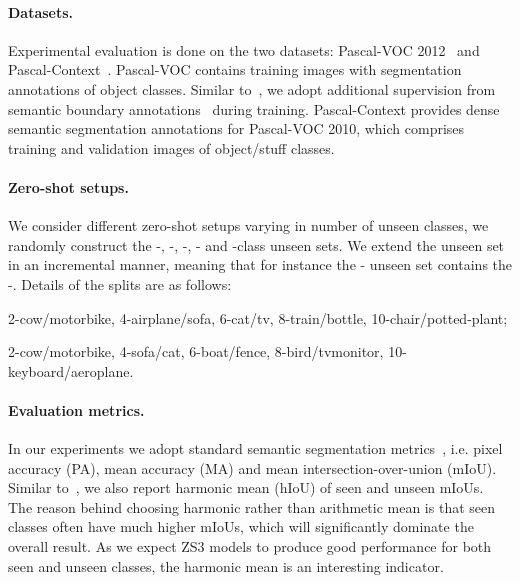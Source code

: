 \documentclass{article}
\begin{document}
\paragraph{Datasets.} Experimental evaluation is done on the two datasets: Pascal-VOC 2012~\cite{everingham2015pascal} and Pascal-Context~\cite{mottaghi2014role}.
Pascal-VOC contains  training images with segmentation annotations of  object classes.
Similar to~\cite{chen2018encoder}, we adopt additional supervision from semantic boundary annotations~\cite{hariharan2011semantic} during training.
Pascal-Context provides dense semantic segmentation annotations for Pascal-VOC 2010, which comprises  training and  validation images of  object/stuff classes.


\vspace{-0.3cm}
\paragraph{Zero-shot setups.}
We consider different zero-shot setups varying in number of unseen classes, we randomly construct the -, -, -, - and -class unseen sets.
We extend the unseen set in an incremental manner, meaning that for instance the - unseen set contains the -. Details of the splits are as follows:

\begin{description}[noitemsep,topsep=0pt]
\vspace{-0.1cm}
\small{
\item[\,\,\,\,\,\,\,\,\,\,\textit{Pascal-VOC:}] 2-cow/motorbike, 4-airplane/sofa, 6-cat/tv, 8-train/bottle, 10-chair/potted-plant; 
\item[\,\,\,\,\,\,\,\,\,\,\textit{Pascal-Context:}] 2-cow/motorbike, 4-sofa/cat, 6-boat/fence, 8-bird/tvmonitor, 10-keyboard/aeroplane.
}
\end{description}

\vspace{-0.3cm}
\paragraph{Evaluation metrics.}
In our experiments we adopt standard semantic segmentation metrics~\cite{long2015fully}, i.e. pixel accuracy (PA), mean accuracy (MA) and mean intersection-over-union (mIoU).
Similar to~\cite{xian2018zero}, we also report harmonic mean (hIoU) of seen and unseen mIoUs.
The reason behind choosing harmonic rather than arithmetic mean is that seen classes often have much higher mIoUs, which will significantly dominate the overall result.
As we expect ZS3 models to produce good performance for both seen and unseen classes, the harmonic mean is an interesting indicator.
 
\end{document}
